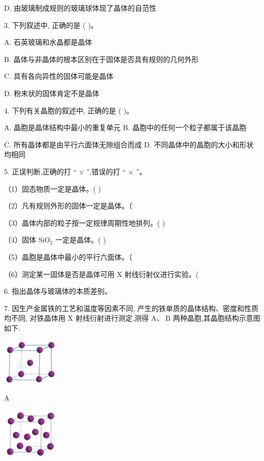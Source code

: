 \documentclass[10pt]{article}
\begin{document}
D. 由玻璃制成规则的玻璃球体现了晶体的自范性

3. 下列叙述中, 正确的是 ( )。

A. 石英玻璃和水晶都是晶体

B. 晶体与非晶体的根本区别在于固体是否具有规则的几何外形

C. 具有各向异性的固体可能是晶体

D. 粉末状的固体肯定不是晶体

4. 下列有关晶胞的叙述中, 正确的是 ( )。

A. 晶胞是晶体结构中最小的重复单元 B. 晶胞中的任何一个粒子都属于该晶胞

C. 所有晶体都是由平行六面体无隙组合而成 D. 不同晶体中的晶胞的大小和形状均相同

5. 正误判断,正确的打 “ \(\vee\) ”,错误的打 “ \(\times\) ”。

（1）固态物质一定是晶体。( )

（2）凡有规则外形的固体一定是晶体。（

（3）晶体内部的粒子按一定规律周期性地排列。( )

（4）固体 \({\mathrm{{SiO}}}_{2}\) 一定是晶体。( )

（5）晶胞是晶体中最小的平行六面体。（

（6）测定某一固体是否是晶体可用 \(\mathrm{X}\) 射线衍射仪进行实验。(

6. 指出晶体与玻璃体的本质差别。

7. 因生产金属铁的工艺和温度等因素不同, 产生的铁单质的晶体结构、密度和性质均不同, 对铁晶体用 \(\mathrm{X}\) 射线衍射进行测定,测得 \(\mathrm{A}\text{、}\mathrm{\;B}\) 两种晶胞,其晶胞结构示意图如下:

\begin{center}
\includegraphics[max width=0.2\textwidth]{images/0190e026-5a11-7df7-bd27-54d09026ba7a_80_138890.jpg}
\end{center}

A

\begin{center}
\includegraphics[max width=0.2\textwidth]{images/0190e026-5a11-7df7-bd27-54d09026ba7a_80_500178.jpg}
\end{center}
\end{document}
